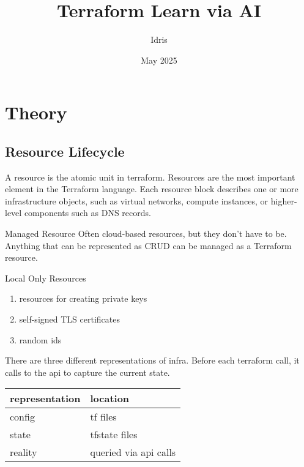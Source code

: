 \documentclass[openany, 12pt]{book}
\title{Terraform Learn via AI}
\author{Idris}
\date{May 2025}
\begin{document}
\tableofcontents

\part{Theory}
\chapter{Resource Lifecycle}
A resource is the atomic unit in terraform. Resources are the most important
element in the Terraform language. Each resource block describes one or more
infrastructure objects, such as virtual networks, compute instances, or
higher-level components such as DNS records.

\begin{definition}{Managed Resource}{}
	Often cloud-based resources, but they don’t have to be. Anything that can be
	represented as CRUD can be managed as a Terraform resource.
\end{definition}

\begin{example}{Local Only Resources}{}
	\begin{enumerate}[label = {(\arabic*)}]
		\item resources for creating private keys
		\item self-signed TLS certificates
		\item random ids
	\end{enumerate}
\end{example}

There are three different representations of infra. Before each terraform call,
it calls to the api to capture the current state.

\begin{center}
	\begin{tabular}{ll}
		\toprule
		representation & location              \\
		\midrule
		config         & tf files              \\
		state          & tfstate files         \\
		reality        & queried via api calls \\
		\bottomrule
	\end{tabular}
\end{center}
\end{document}
